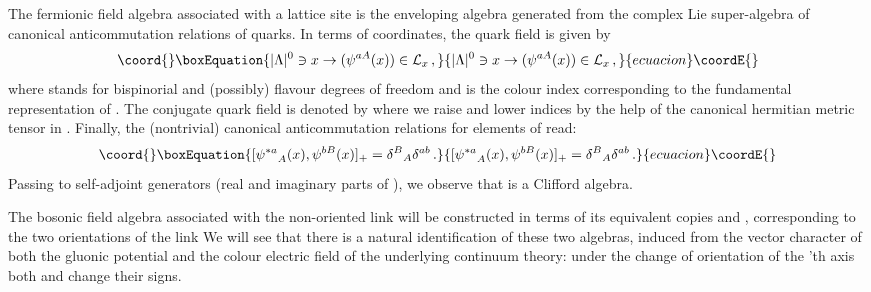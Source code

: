 \documentclass[a4paper,12pt]{article}
\begin{document}
The fermionic field algebra \coordHE{} associated with a lattice
site \coordHE{} is the enveloping algebra generated from the complex Lie
super-algebra \coordHE{} of canonical anticommutation relations
of quarks. In terms of coordinates, the quark field is given by
\begin{equation}\coord{}\boxEquation{
|{\Lambda}|^0 \ni x \rightarrow  ({\psi}^{aA}(x)) \in {\cal L}_x
\, ,
}{
|{\Lambda}|^0 \ni x \rightarrow  ({\psi}^{aA}(x)) \in {\cal L}_x
\, ,
}{ecuacion}\coordE{}\end{equation}
where \coordHE{} stands for bispinorial and (possibly) flavour degrees of
freedom and \coordHE{} is the colour index corresponding to the
fundamental representation of \coordHE{}. The conjugate quark field
is denoted by \coordHE{} where we raise and lower
indices by the help of the canonical hermitian metric tensor
\coordHE{} in \coordHE{}. Finally, the (nontrivial) canonical
anticommutation relations for elements of \coordHE{} read:
\begin{equation}\coord{}\boxEquation{
\label{CCR3} [{\psi^{*a}}_{A}(x), \psi^{bB}(x)]_+ = {\delta^B}_A
\delta^{ab} \, .
}{
[{\psi^{*a}}_{A}(x), \psi^{bB}(x)]_+ = {\delta^B}_A
\delta^{ab} \, .
}{ecuacion}\coordE{}\end{equation}
Passing to self-adjoint generators (real and imaginary parts of
\myHighlight{$\psi$}\coordHE{}), we observe that \coordHE{} is a Clifford algebra.


The bosonic field algebra \coordHE{} associated with the
non-oriented link \coordHE{} will be constructed in terms of its
equivalent copies \coordHE{} and \coordHE{},
corresponding to the two orientations of the link \coordHE{} We
will see that there is a natural identification of these two
algebras, induced from the vector character of both the gluonic
potential \coordHE{} and the colour electric field \coordHE{} of the underlying
continuum theory: under the change of orientation of the \coordHE{}'th
axis both \coordHE{} and \coordHE{} change their signs.
\end{document}
